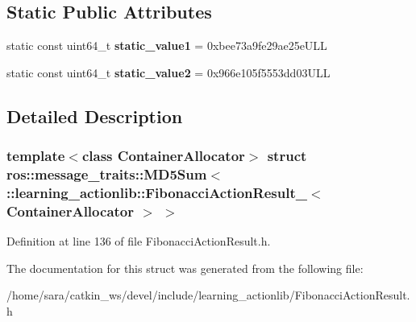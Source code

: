 \subsection*{Static Public Attributes}
\begin{DoxyCompactItemize}
\item 
\mbox{\label{structros_1_1message__traits_1_1MD5Sum_3_01_1_1learning__actionlib_1_1FibonacciActionResult___3_01ContainerAllocator_01_4_01_4_af3cfff44445038588ee58b29300b5a7e}} 
static const uint64\+\_\+t {\bfseries static\+\_\+value1} = 0xbee73a9fe29ae25e\+U\+LL
\item 
\mbox{\label{structros_1_1message__traits_1_1MD5Sum_3_01_1_1learning__actionlib_1_1FibonacciActionResult___3_01ContainerAllocator_01_4_01_4_a89dbdf2ab0b1329444227817c9099aec}} 
static const uint64\+\_\+t {\bfseries static\+\_\+value2} = 0x966e105f5553dd03\+U\+LL
\end{DoxyCompactItemize}


\subsection{Detailed Description}
\subsubsection*{template$<$class Container\+Allocator$>$\newline
struct ros\+::message\+\_\+traits\+::\+M\+D5\+Sum$<$ \+::learning\+\_\+actionlib\+::\+Fibonacci\+Action\+Result\+\_\+$<$ Container\+Allocator $>$ $>$}



Definition at line 136 of file Fibonacci\+Action\+Result.\+h.



The documentation for this struct was generated from the following file\+:\begin{DoxyCompactItemize}
\item 
/home/sara/catkin\+\_\+ws/devel/include/learning\+\_\+actionlib/Fibonacci\+Action\+Result.\+h\end{DoxyCompactItemize}
